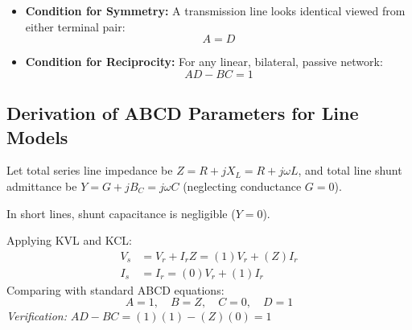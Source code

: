 \documentclass[11pt,a4paper]{article}
\newenvironment{Note}[1][Note]{\begin{tcolorbox}[notebox, title=#1]}{\end{tcolorbox}}
\newenvironment{Deriv}[1][Mathematical Derivation]{\begin{tcolorbox}[derivbox, title=#1]}{\end{tcolorbox}}
\begin{document}
\begin{Note}[Fundamental Network Conditions]
\begin{itemize}
  \item \textbf{Condition for Symmetry:} A transmission line looks identical viewed from either terminal pair:
    \begin{equation}
      A = D
    \end{equation}
  \item \textbf{Condition for Reciprocity:} For any linear, bilateral, passive network:
    \begin{equation}
      A D - B C = 1
    \end{equation}
\end{itemize}
\end{Note}

\subsection{Derivation of ABCD Parameters for Line Models}

Let total series line impedance be $Z = R + j X_L = R + j\omega L$, and total line shunt admittance be $Y = G + j B_C = j\omega C$ (neglecting conductance $G=0$).

\begin{Deriv}[1. Short Transmission Line Model ($< 80\,\text{km}$)]
In short lines, shunt capacitance is negligible ($Y = 0$).
\begin{center}
\end{center}
Applying KVL and KCL:
\begin{align}
  V_s &= V_r + I_r Z = (1) V_r + (Z) I_r \\
  I_s &= I_r = (0) V_r + (1) I_r
\end{align}
Comparing with standard ABCD equations:
\begin{equation}
  A = 1, \quad B = Z, \quad C = 0, \quad D = 1
\end{equation}
\emph{Verification:} $AD - BC = (1)(1) - (Z)(0) = 1$ \quad \checkmark
\end{Deriv}
\end{document}
